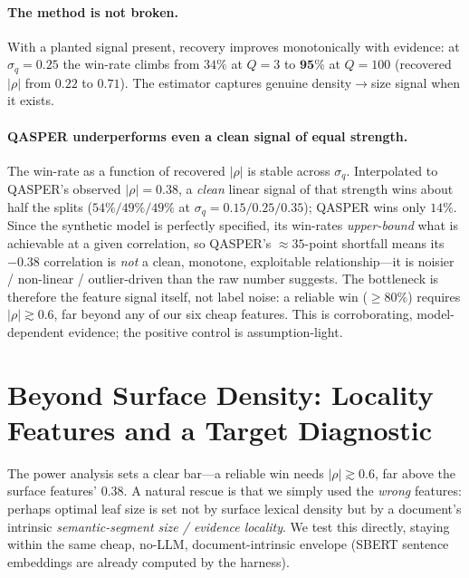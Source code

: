 \documentclass[11pt]{article}
\begin{document}
\paragraph{The method is not broken.} With a planted signal present, recovery
improves monotonically with evidence: at $\sigma_q{=}0.25$ the win-rate climbs from
$34\%$ at $Q{=}3$ to $\mathbf{95\%}$ at $Q{=}100$ (recovered $|\rho|$ from $0.22$ to
$0.71$). The estimator captures genuine density$\to$size signal when it exists.

\paragraph{QASPER underperforms even a clean signal of equal strength.} The
win-rate as a function of recovered $|\rho|$ is stable across $\sigma_q$. Interpolated
to QASPER's observed $|\rho|{=}0.38$, a \emph{clean} linear signal of that strength
wins about half the splits ($54\%/49\%/49\%$ at $\sigma_q{=}0.15/0.25/0.35$); QASPER
wins only $14\%$. Since the synthetic model is perfectly specified, its win-rates
\emph{upper-bound} what is achievable at a given correlation, so QASPER's
$\approx 35$-point shortfall means its $-0.38$ correlation is \emph{not} a clean,
monotone, exploitable relationship---it is noisier / non-linear / outlier-driven
than the raw number suggests. The bottleneck is therefore the feature signal
itself, not label noise: a reliable win ($\ge 80\%$) requires $|\rho|\gtrsim 0.6$,
far beyond any of our six cheap features. This is corroborating, model-dependent
evidence; the positive control is assumption-light.

\section{Beyond Surface Density: Locality Features and a Target Diagnostic}
\label{sec:locality}

The power analysis sets a clear bar---a reliable win needs $|\rho|\gtrsim 0.6$, far
above the surface features' $0.38$. A natural rescue is that we simply used the
\emph{wrong} features: perhaps optimal leaf size is set not by surface lexical
density but by a document's intrinsic \emph{semantic-segment size / evidence
locality}. We test this directly, staying within the same cheap, no-LLM,
document-intrinsic envelope (SBERT sentence embeddings are already computed by the
harness).
\end{document}
